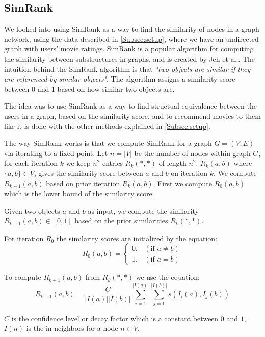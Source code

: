 \subsection{SimRank}
\label{Subsec:SimRank}
We looked into using SimRank as a way to find the similarity of nodes in a graph network, using the data described in \autoref{Subsec:setup}, where we have an undirected graph with users' movie ratings.
SimRank is a popular algorithm for computing the similarity between substructures in graphs, and is created by Jeh et al.\cite{10.1145/775047.775126}.
The intuition behind the SimRank algorithm is that \emph{"two objects are similar if they are referenced by similar objects"}\cite{10.1145/775047.775126}. The algorithm assigns a similarity score between 0 and 1 based on how similar two objects are.

The idea was to use SimRank as a way to find structual equivalence between the users in a graph, based on the similarity score, and to recommend movies to them like it is done with the other methods explained in \autoref{Subsec:setup}.

The way SimRank works is that we compute SimRank for a graph $G = (V,E)$ via iterating to a fixed-point. 
Let $n = |V|$ be the number of nodes within graph $G$, for each iteration $k$ we keep $n^2$ entries $R_k(*,*)$ of length $n^2$.
$R_k(a,b)$ where $\{a,b\} \in V$, gives the similarity score between $a$ and $b$ on iteration $k$\cite{10.1145/775047.775126}.
We compute $R_{k+1}(a,b)$ based on prior iteration $R_k(a,b)$.
First we compute $R_0(a,b)$ which is the lower bound of the similarity score.

\begin{definition}[SimRank]\label{def:simrank} Given two objects $a$ and $b$ as input, we compute the similarity $R_{k+1}(a,b) \in [0,1]$ based on the prior similarities $R_k(*,*)$.

For iteration $R_0$ the similarity scores are initialized by the equation:
\begin{equation}\label{eq:lowerbound_sim_score}
R_0(a,b)= \begin{cases}
0, & (\text{if } a \neq b) \\

1 ,& (\text{if } a = b)
\end{cases}
\end{equation}

To compute $R_{k+1}(a,b)$ from $R_k(*,*)$ we use the equation:
\begin{equation}\label{eq:simrank_computation}
R_{k+1}(a,b)= \frac{C}{|I(a)||I(b)|}\sum^{|I(a)|}_{i=1}\sum^{|I(b)|}_{j=1}s(I_i(a),I_j(b))
\end{equation}

$C$ is the confidence level or decay factor which is a constant between $0$ and $1$, $I(n)$ is the in-neighbors for a node $n \in V$.

\end{definition}

